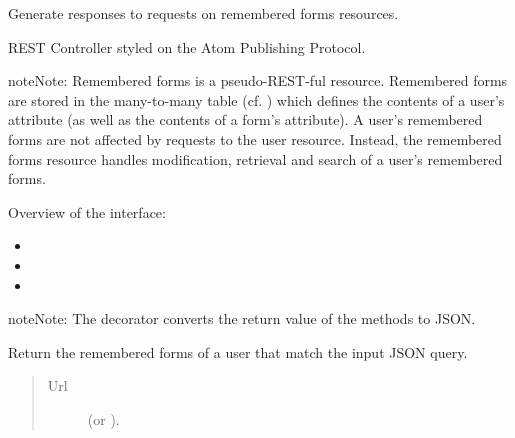 \documentclass[letterpaper,10pt,english]{sphinxmanual}
\begin{document}
\begin{fulllineitems}
\label{api:onlinelinguisticdatabase.controllers.rememberedforms.RememberedformsController}
Generate responses to requests on remembered forms resources.

REST Controller styled on the Atom Publishing Protocol.

\begin{notice}{note}{Note:}
Remembered forms is a pseudo-REST-ful resource.  Remembered forms are
stored in the  many-to-many table (cf. )
which defines the contents of a user's  attribute
(as well as the contents of a form's  attribute). A user's
remembered forms are not affected by requests to the user resource.
Instead, the remembered forms resource handles modification, retrieval
and search of a user's remembered forms.

Overview of the interface:
\begin{itemize}
\item {} 

\item {} 

\item {} 

\end{itemize}
\end{notice}

\begin{notice}{note}{Note:}
The  decorator converts the return value of the methods to
JSON.
\end{notice}

\begin{fulllineitems}
\label{api:onlinelinguisticdatabase.controllers.rememberedforms.RememberedformsController.search}
Return the remembered forms of a user that match the input JSON query.
\begin{quote}\begin{description}
\item[{Url }] \leavevmode
{} (or ).


\end{description}
\end{quote}
\end{fulllineitems}
\end{fulllineitems}
\end{document}
